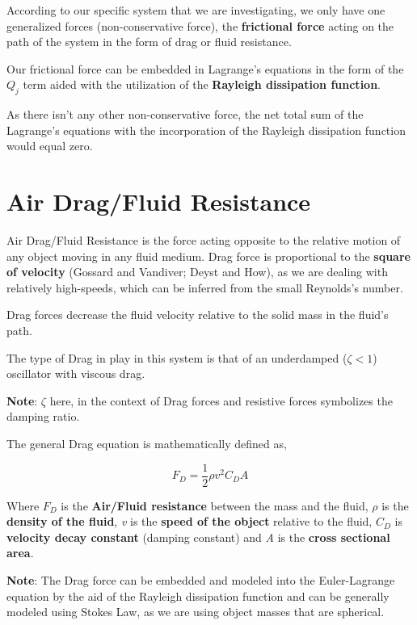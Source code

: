     {According to our specific system that we are investigating, we only have one generalized forces (non-conservative force), the \textbf{frictional force} acting on the path of the system in the form of drag or fluid resistance.}
        
    {Our frictional force can be embedded in Lagrange's equations in the form of the $Q_j$ term aided with the utilization of the \textbf{Rayleigh dissipation function}.}
        
    {As there isn't any other non-conservative force, the net total sum of the Lagrange's equations with the incorporation of the Rayleigh dissipation function would equal zero.}
        
\section{{Air Drag/Fluid Resistance}}
        
    {Air Drag/Fluid Resistance is the force acting opposite to the relative motion of any object moving in any fluid medium. Drag force is proportional to the \textbf{square of velocity} (Gossard and Vandiver; Deyst and How), as we are dealing with relatively high-speeds, which can be inferred from the small Reynolds's number.}
            
    {Drag forces decrease the fluid velocity relative to the solid mass in the fluid's path.}
            
    {The type of Drag in play in this system is that of an underdamped ($\zeta < 1$) oscillator with viscous drag.}
            
    {\textbf{Note}: $\zeta$ here, in the context of Drag forces and resistive forces symbolizes the damping ratio.}
            
    {The general Drag equation is mathematically defined as,}
            
        $$F_D = \frac{1}{2}\rho v^2C_DA$$
           
    {Where $F_D$ is the \textbf{Air/Fluid resistance} between the mass and the fluid, $\rho$ is the \textbf{density of the fluid}, \textit{v} is the \textbf{speed of the object} relative to the fluid, $C_D$ is \textbf{velocity decay constant} (damping constant) and \textit{A} is the \textbf{cross sectional area}.}
            
    {\textbf{Note}: The Drag force can be embedded and modeled into the Euler-Lagrange equation by the aid of the Rayleigh dissipation function and can be generally modeled using Stokes Law, as we are using object masses that are spherical.}
            
